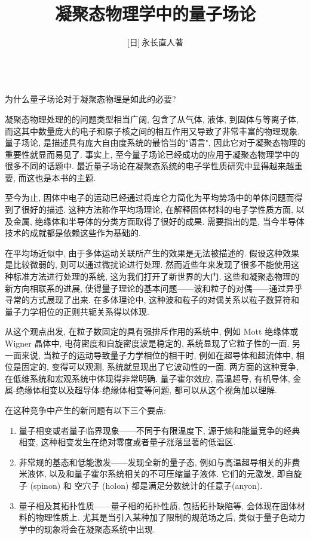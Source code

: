\documentclass[b5paper]{book}
\title{\bf{凝聚态物理学中的量子场论}}
\author{[日]\,永长直人\quad 著}
\date{}
\begin{document}
\maketitle
{\frontmatter
{}\\

为什么量子场论对于凝聚态物理是如此的必要?

凝聚态物理处理的的问题类型相当广阔, 包含了从气体, 液体, 到固体与等离子体, 而这其中数量庞大的电子和原子核之间的相互作用又导致了非常丰富的物理现象. 量子场论, 是描述具有庞大自由度系统的最恰当的"语言", 因此它对于凝聚态物理的重要性就显而易见了. 事实上, 至今量子场论已经成功的应用于凝聚态物理学中的很多不同的话题中. 最近量子场论在凝聚态系统的电子学性质研究中显得越来越重要, 而这也是本书的主题.

至今为止, 固体中电子的运动已经通过将库仑力简化为平均势场中的单体问题而得到了很好的描述. 这种方法称作平均场理论, 在解释固体材料的电子学性质方面, 以及金属, 绝缘体和半导体的分类方面取得了很好的成果. 需要指出的是, 当今半导体技术的成就都是依赖这些作为基础的.

在平均场近似中, 由于多体运动关联所产生的效果是无法被描述的. 假设这种效果是比较微弱的, 则可以通过微扰论进行处理. 然而近些年来发现了很多不能使用这种标准方法进行处理的系统, 这为我们打开了新世界的大门. 这些和凝聚态物理的新方向相联系的进展, 使得量子理论的基本问题------波和粒子的对偶------通过异乎寻常的方式展现了出来. 在多体理论中, 这种波和粒子的对偶关系以粒子数算符和量子力学相位的正则共轭关系得以体现.

从这个观点出发, 在粒子数固定的具有强排斥作用的系统中, 例如 Mott 绝缘体或 Wigner 晶体中, 电荷密度和自旋密度波是稳定的, 系统显现了它粒子性的一面. 另一面来说, 当粒子的运动导致量子力学相位的相干时, 例如在超导体和超流体中, 相位是固定的, 变得可以观测, 系统就显现出了它波动性的一面. 两方面的这种竞争, 在低维系统和宏观系统中体现得非常明确. 量子霍尔效应, 高温超导, 有机导体, 金属-绝缘体相变以及超导体-绝缘体相变等问题, 都可以从这个视角加以理解.

在这种竞争中产生的新问题有以下三个要点:
\begin{enumerate}
  \item{量子相变或者量子临界现象------不同于有限温度下, 源于熵和能量竞争的经典相变, 这种相变发生在绝对零度或者量子涨落显著的低温区.}
  \item{非常规的基态和低能激发------发现全新的量子态, 例如与高温超导相关的非费米液体, 以及和量子霍尔系统相关的不可压缩量子液体. 它们的元激发, 即自旋子 (spinon) 和 空穴子 (holon) 都是满足分数统计的任意子(anyon).}
  \item{量子相及其拓扑性质------量子相的拓扑性质, 包括拓扑缺陷等, 会体现在固体材料的物理性质上. 尤其是当引入某种加了限制的规范场之后, 类似于量子色动力学中的现象将会在凝聚态系统中出现. }
\end{enumerate}

}
\end{document}
